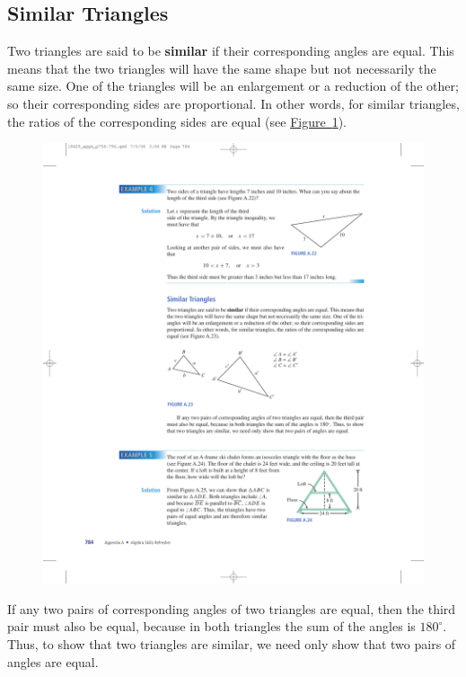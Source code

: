 \documentclass[10pt,]{book}
\newcommand{\terminology}[1]{\textbf{#1}}
\theoremstyle{plain}
\theoremstyle{definition}
\theoremstyle{definition}
\theoremstyle{definition}
\numberwithin{equation}{part}
\newcommand\degree[0]{^{\circ}}
\begin{document}
\subsection[{Similar Triangles}]{Similar Triangles}\label{subsection-54}
Two triangles are said to be \terminology{similar} if their corresponding angles are equal. This means that the two triangles will have the same shape but not necessarily the same size. One of the triangles will be an enlargement or a reduction of the other; so their corresponding sides are proportional. In other words, for similar triangles, the ratios of the corresponding sides are equal (see \hyperref[fig-similar-triangles]{Figure~\ref{fig-similar-triangles}}). \leavevmode%
\begin{figure}
\centering
\includegraphics[width=0.7\linewidth]{images/fig-similar-triangles}
\caption{\label{fig-similar-triangles}}
\end{figure}
%
\par
If any two pairs of corresponding angles of two triangles are equal, then the third pair must also be equal, because in both triangles the sum of the angles is \(180\degree\). Thus, to show that two triangles are similar, we need only show that two pairs of angles are equal.%
\end{document}
